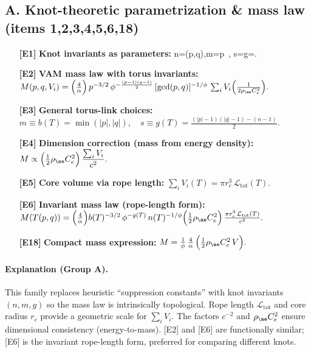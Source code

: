 \documentclass[11pt]{article}
\begin{document}
    \subsection{A. Knot-theoretic parametrization \& mass law (items 1,2,3,4,5,6,18)}
    \begin{enumerate}
        \item[\textbf{[E1]}] \textbf{Knot invariants as parameters:}\quad
        n=\gcd(p,q),\quad m=p\ ,\quad
        s=g=.
        \item[\textbf{[E2]}] \textbf{VAM mass law with torus invariants:}\quad
        \(
        M(p,q,V_i)=\Big(\frac{4}{\alpha}\Big)\,p^{-3/2}\,\phi^{-\frac{(p-1)(q-1)}{2}}\,[\gcd(p,q)]^{-1/\phi}\,
        \sum_i V_i\Big(\frac{1}{2\rho_{\ae}C_e^2}\Big).
        \)
        \item[\textbf{[E3]}] \textbf{General torus-link choices:}\quad
        \(m\equiv b(T)=\min(|p|,|q|),\quad
        s\equiv g(T)=\frac{(|p|-1)(|q|-1)-(n-1)}{2}.\)
        \item[\textbf{[E4]}] \textbf{Dimension correction (mass from energy density):}\quad
        \(M\propto\Big(\tfrac12\rho_{\ae}C_e^2\Big)\,\dfrac{\sum_i V_i}{c^2}.\)
        \item[\textbf{[E5]}] \textbf{Core volume via rope length:}\quad
        \(\displaystyle \sum_i V_i(T)=\pi r_c^3\,\mathcal{L}_{\mathrm{tot}}(T).\)
        \item[\textbf{[E6]}] \textbf{Invariant mass law (rope-length form):}\quad
        \(
        M(T(p,q))=\Big(\frac{4}{\alpha}\Big)b(T)^{-3/2}\,\phi^{-g(T)}\,n(T)^{-1/\phi}
        \Big(\frac{1}{2}\rho_{\ae}C_e^2\Big)\,
        \frac{\pi r_c^3\,\mathcal{L}_{\mathrm{tot}}(T)}{c^2}.
        \)
        \item[\textbf{[E18]}] \textbf{Compact mass expression:}\quad
        \(
        M=\frac{1}{\phi}\,\frac{4}{\alpha}\,\Big(\tfrac12\rho_{\ae}C_e^2\,V\Big).
        \)
    \end{enumerate}

    \paragraph{Explanation (Group A).}
    This family replaces heuristic “suppression constants” with knot invariants \((n,m,g)\) so the mass law is intrinsically topological.
    Rope length \(\mathcal{L}_{\mathrm{tot}}\) and core radius \(r_c\) provide a geometric scale for \(\sum_i V_i\).
    The factors \(c^{-2}\) and \(\rho_{\ae}C_e^2\) ensure dimensional consistency (energy-to-mass).
    [E2] and [E6] are functionally similar; [E6] is the invariant rope-length form, preferred for comparing different knots.
\end{document}
